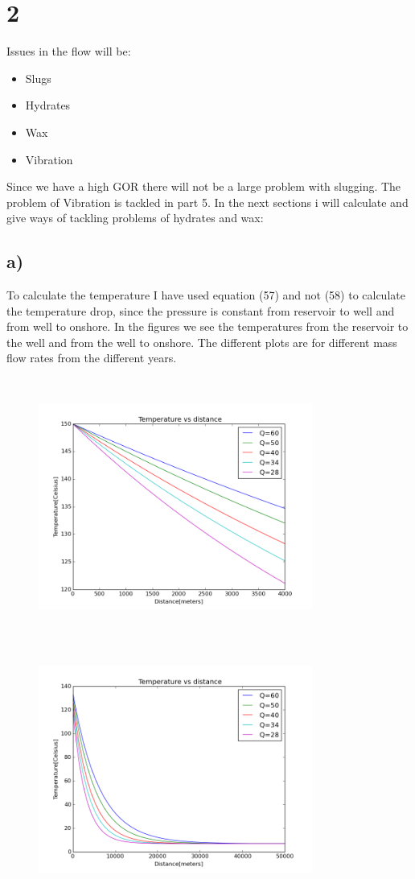 \documentclass[DIV=calc, paper=a4, fontsize=13pt, twocolumn]{scrartcl}	 %
\begin{document}
\newpage
\section*{2}
Issues in the flow will be:
\begin{itemize}
\item Slugs
\item Hydrates
\item Wax
\item Vibration
\end{itemize}
Since we have a high GOR there will not be a large problem with slugging. The problem of Vibration is tackled in part 5.
In the next sections i will calculate and give ways of tackling problems of hydrates and wax:
\subsection*{a)}
To calculate the temperature 
I have used equation (57) and not (58) to calculate the temperature drop, since the pressure is constant from reservoir to well and from well to onshore.
In the figures we see the temperatures from the reservoir to the well and from the well to onshore. The different plots are for different mass flow rates from the different years.
\begin{figure}[h]
\includegraphics[width=9cm,height=8.5cm]{Temp1.png}
\includegraphics[width=9cm,height=8.5cm]{temp2.png}
\end{figure}
\end{document}
